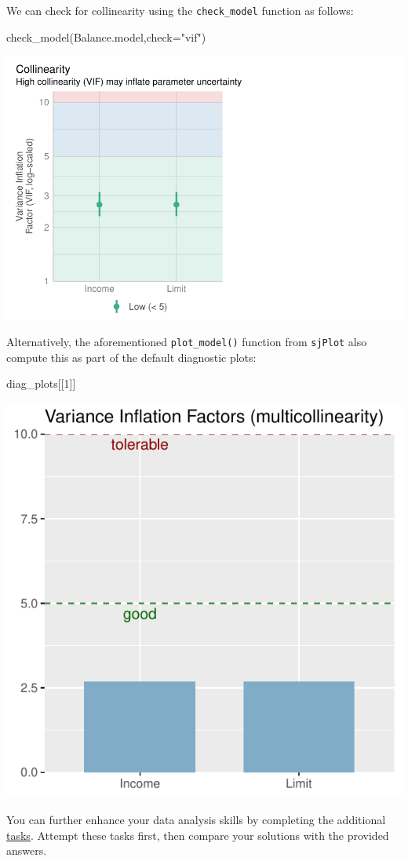 \documentclass[
  letterpaper,
  DIV=11,
  numbers=noendperiod]{scrartcl}
\newenvironment{Shaded}{\begin{snugshade}}{\end{snugshade}}
\newcommand{\AttributeTok}[1]{\textcolor[rgb]{0.40,0.45,0.13}{#1}}
\newcommand{\DecValTok}[1]{\textcolor[rgb]{0.68,0.00,0.00}{#1}}
\newcommand{\FunctionTok}[1]{\textcolor[rgb]{0.28,0.35,0.67}{#1}}
\newcommand{\NormalTok}[1]{\textcolor[rgb]{0.00,0.23,0.31}{#1}}
\newcommand{\StringTok}[1]{\textcolor[rgb]{0.13,0.47,0.30}{#1}}
\begin{document}
We can check for collinearity using the \texttt{check\_model} function
as follows:

\begin{Shaded}
\begin{Highlighting}[]
\FunctionTok{check\_model}\NormalTok{(Balance.model,}\AttributeTok{check=}\StringTok{"vif"}\NormalTok{)}
\end{Highlighting}
\end{Shaded}

\begin{center}
\includegraphics{index_files/figure-pdf/unnamed-chunk-35-1.pdf}
\end{center}

Alternatively, the aforementioned \texttt{plot\_model()} function from
\texttt{sjPlot} also compute this as part of the default diagnostic
plots:

\begin{Shaded}
\begin{Highlighting}[]
\NormalTok{diag\_plots[[}\DecValTok{1}\NormalTok{]]}
\end{Highlighting}
\end{Shaded}

\begin{center}
\includegraphics{index_files/figure-pdf/unnamed-chunk-36-1.pdf}
\end{center}

You can further enhance your data analysis skills by completing the
additional \href{about.qmd}{tasks}. Attempt these tasks first, then
compare your solutions with the provided answers.
\end{document}
